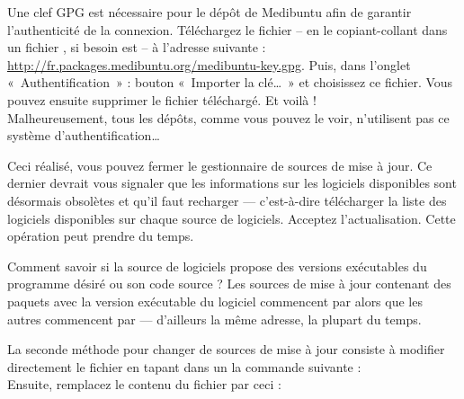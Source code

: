 {Une clef GPG est nécessaire pour le dépôt de Medibuntu afin de garantir l'authenticité de la connexion. Téléchargez le fichier  -- en le copiant-collant dans un fichier , si besoin est -- à l'adresse suivante : \url{http://fr.packages.medibuntu.org/medibuntu-key.gpg}. Puis, dans l'onglet «~Authentification~» : bouton «~Importer la clé\ldots{}~» et choisissez ce fichier. Vous pouvez ensuite supprimer le fichier téléchargé. Et voilà !\\
Malheureusement, tous les dépôts, comme vous pouvez le voir, n'utilisent pas ce système d'authentification\ldots{}\par
Ceci réalisé, vous pouvez fermer le gestionnaire de sources de mise à jour. Ce dernier devrait vous signaler que les informations sur les logiciels disponibles sont désormais obsolètes et qu'il faut recharger --- c'est-à-dire télécharger la liste des logiciels disponibles sur chaque source de logiciels. Acceptez l'actualisation. Cette opération peut prendre du temps.\par
\begin{nota}
Comment savoir si la source de logiciels propose des versions exécutables du programme désiré ou son code source ? Les sources de mise à jour contenant des paquets avec la version exécutable du logiciel commencent par  alors que les autres commencent par  --- d'ailleurs la même adresse, la plupart du temps.
\end{nota}
La seconde méthode pour changer de sources de mise à jour consiste à modifier directement le fichier  en tapant dans un  la commande suivante : \\
Ensuite, remplacez le contenu du fichier par ceci :\\
}
